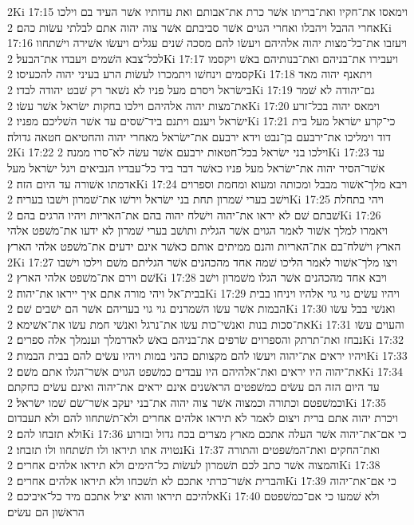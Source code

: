 2Ki 17:15  וימאסו את־חקיו ואת־בריתו אשׁר כרת את־אבותם ואת עדותיו אשׁר העיד בם וילכו אחרי ההבל ויהבלו ואחרי הגוים אשׁר סביבתם אשׁר צוה יהוה אתם לבלתי עשׂות כהם׃
2Ki 17:16  ויעזבו את־כל־מצות יהוה אלהיהם ויעשׂו להם מסכה שׁנים עגלים ויעשׂו אשׁירה וישׁתחוו לכל־צבא השׁמים ויעבדו את־הבעל׃
2Ki 17:17  ויעבירו את־בניהם ואת־בנותיהם באשׁ ויקסמו קסמים וינחשׁו ויתמכרו לעשׂות הרע בעיני יהוה להכעיסו׃
2Ki 17:18  ויתאנף יהוה מאד בישׂראל ויסרם מעל פניו לא נשׁאר רק שׁבט יהודה לבדו׃
2Ki 17:19  גם־יהודה לא שׁמר את־מצות יהוה אלהיהם וילכו בחקות ישׂראל אשׁר עשׂו׃
2Ki 17:20  וימאס יהוה בכל־זרע ישׂראל ויענם ויתנם ביד־שׁסים עד אשׁר השׁליכם מפניו׃
2Ki 17:21  כי־קרע ישׂראל מעל בית דוד וימליכו את־ירבעם בן־נבט וידא ירבעם את־ישׂראל מאחרי יהוה והחטיאם חטאה גדולה׃
2Ki 17:22  וילכו בני ישׂראל בכל־חטאות ירבעם אשׁר עשׂה לא־סרו ממנה׃
2Ki 17:23  עד אשׁר־הסיר יהוה את־ישׂראל מעל פניו כאשׁר דבר ביד כל־עבדיו הנביאים ויגל ישׂראל מעל אדמתו אשׁורה עד היום הזה׃
2Ki 17:24  ויבא מלך־אשׁור מבבל ומכותה ומעוא ומחמת וספרוים וישׁב בערי שׁמרון תחת בני ישׂראל וירשׁו את־שׁמרון וישׁבו בעריה׃
2Ki 17:25  ויהי בתחלת שׁבתם שׁם לא יראו את־יהוה וישׁלח יהוה בהם את־האריות ויהיו הרגים בהם׃
2Ki 17:26  ויאמרו למלך אשׁור לאמר הגוים אשׁר הגלית ותושׁב בערי שׁמרון לא ידעו את־משׁפט אלהי הארץ וישׁלח־בם את־האריות והנם ממיתים אותם כאשׁר אינם ידעים את־משׁפט אלהי הארץ׃
2Ki 17:27  ויצו מלך־אשׁור לאמר הליכו שׁמה אחד מהכהנים אשׁר הגליתם משׁם וילכו וישׁבו שׁם וירם את־משׁפט אלהי הארץ׃
2Ki 17:28  ויבא אחד מהכהנים אשׁר הגלו משׁמרון וישׁב בבית־אל ויהי מורה אתם איך ייראו את־יהוה׃
2Ki 17:29  ויהיו עשׂים גוי גוי אלהיו ויניחו בבית הבמות אשׁר עשׂו השׁמרנים גוי גוי בעריהם אשׁר הם ישׁבים שׁם׃
2Ki 17:30  ואנשׁי בבל עשׂו את־סכות בנות ואנשׁי־כות עשׂו את־נרגל ואנשׁי חמת עשׂו את־אשׁימא׃
2Ki 17:31  והעוים עשׂו נבחז ואת־תרתק והספרוים שׂרפים את־בניהם באשׁ לאדרמלך וענמלך אלה ספרים׃
2Ki 17:32  ויהיו יראים את־יהוה ויעשׂו להם מקצותם כהני במות ויהיו עשׂים להם בבית הבמות׃
2Ki 17:33  את־יהוה היו יראים ואת־אלהיהם היו עבדים כמשׁפט הגוים אשׁר־הגלו אתם משׁם׃
2Ki 17:34  עד היום הזה הם עשׂים כמשׁפטים הראשׁנים אינם יראים את־יהוה ואינם עשׂים כחקתם וכמשׁפטם וכתורה וכמצוה אשׁר צוה יהוה את־בני יעקב אשׁר־שׂם שׁמו ישׂראל׃
2Ki 17:35  ויכרת יהוה אתם ברית ויצום לאמר לא תיראו אלהים אחרים ולא־תשׁתחוו להם ולא תעבדום ולא תזבחו להם׃
2Ki 17:36  כי אם־את־יהוה אשׁר העלה אתכם מארץ מצרים בכח גדול ובזרוע נטויה אתו תיראו ולו תשׁתחוו ולו תזבחו׃
2Ki 17:37  ואת־החקים ואת־המשׁפטים והתורה והמצוה אשׁר כתב לכם תשׁמרון לעשׂות כל־הימים ולא תיראו אלהים אחרים׃
2Ki 17:38  והברית אשׁר־כרתי אתכם לא תשׁכחו ולא תיראו אלהים אחרים׃
2Ki 17:39  כי אם־את־יהוה אלהיכם תיראו והוא יציל אתכם מיד כל־איביכם׃
2Ki 17:40  ולא שׁמעו כי אם־כמשׁפטם הראשׁון הם עשׂים׃
